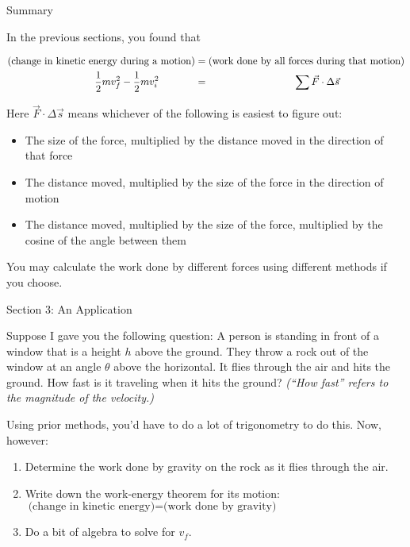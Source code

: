 \documentclass[12pt]{article}
\begin{document}
\vspace{2in}

{\Large Summary}

In the previous sections, you found that

\begin{align*}
\text{(change in kinetic energy during a motion)} &= \text {(work done by all forces during that motion)} \\
\frac{1}{2}mv_f^2 - \frac{1}{2}mv_i^2 \hspace{0.5in} &= \hspace{1.2in}\sum \vec F \cdot \Delta \vec s
\end{align*}

Here $\vec F \cdot \Delta \vec s$ means whichever of the following is easiest to figure out:

\begin{itemize}
\item The size of the force, multiplied by the distance moved in the direction of that force
\item The distance moved, multiplied by the size of the force in the direction of motion
\item The distance moved, multiplied by the size of the force, multiplied by the cosine of the angle between them
\end{itemize}

You may calculate the work done by different forces using different methods if you choose.
\newpage

{\Large Section 3: An Application}

Suppose I gave you the following question: A person is standing in front of a window that is a height $h$ above the ground. They throw a rock out of the window at an angle $\theta$ above the horizontal. It flies through the air and hits the ground. How fast is it traveling when it hits the ground? {\it (``How fast'' refers to the magnitude of the velocity.)}

Using prior methods, you'd have to do a lot of trigonometry to do this. Now, however:

\begin{enumerate}
	\item Determine the work done by gravity on the rock as it flies through the air.
	\vspace{1.5in}
	
	\item Write down the work-energy theorem for its motion: $\text{(change in kinetic energy)}=\text{(work done by gravity)}$
	\vspace{1.5in}
	
	\item Do a bit of algebra to solve for $v_f$.
\end{enumerate}

\vfill
\end{document}
